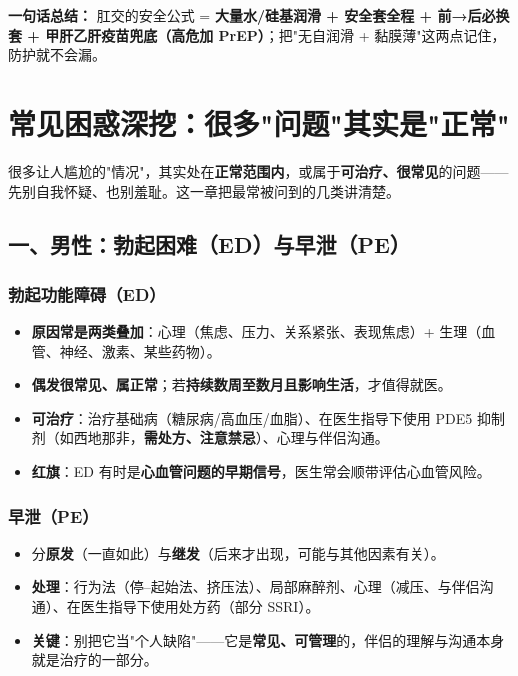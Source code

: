 \documentclass[12pt,UTF8,openany]{ctexbook}
\begin{document}
\vspace{1em}
\noindent\textbf{一句话总结：} 肛交的安全公式 = \textbf{大量水/硅基润滑 + 安全套全程 + 前→后必换套 + 甲肝乙肝疫苗兜底（高危加 PrEP）}；把"无自润滑 + 黏膜薄"这两点记住，防护就不会漏。

\chapter{常见困惑深挖：很多"问题"其实是"正常"}
\label{chap:concerns}

很多让人尴尬的"情况"，其实处在\textbf{正常范围内}，或属于\textbf{可治疗、很常见}的问题——先别自我怀疑、也别羞耻。这一章把最常被问到的几类讲清楚。

\section{一、男性：勃起困难（ED）与早泄（PE）}

\subsection*{勃起功能障碍（ED）}
\begin{itemize}[leftmargin=2em,itemsep=0.3em]
  \item \textbf{原因常是两类叠加}：心理（焦虑、压力、关系紧张、表现焦虑）+ 生理（血管、神经、激素、某些药物）。
  \item \textbf{偶发很常见、属正常}；若\textbf{持续数周至数月且影响生活}，才值得就医。
  \item \textbf{可治疗}：治疗基础病（糖尿病/高血压/血脂）、在医生指导下使用 PDE5 抑制剂（如西地那非，\textbf{需处方、注意禁忌}）、心理与伴侣沟通。
  \item \textbf{红旗}：ED 有时是\textbf{心血管问题的早期信号}，医生常会顺带评估心血管风险。
\end{itemize}

\subsection*{早泄（PE）}
\begin{itemize}[leftmargin=2em,itemsep=0.3em]
  \item 分\textbf{原发}（一直如此）与\textbf{继发}（后来才出现，可能与其他因素有关）。
  \item \textbf{处理}：行为法（停--起始法、挤压法）、局部麻醉剂、心理（减压、与伴侣沟通）、在医生指导下使用处方药（部分 SSRI）。
  \item \textbf{关键}：别把它当"个人缺陷"——它是\textbf{常见、可管理}的，伴侣的理解与沟通本身就是治疗的一部分。
\end{itemize}
\end{document}
